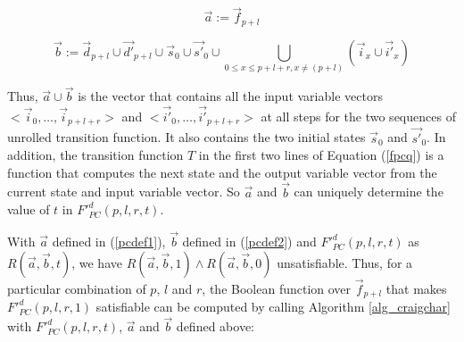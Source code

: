 \documentclass[runningheads,a4paper,orivec]{llncs}
\begin{document}
% 


\begin{equation}\label{pcdef1}
\vec{a}:=\vec{f}_{p+l}
\end{equation}

\begin{equation}\label{pcdef2}
\vec{b}:=\vec{d}_{p+l}\cup \vec{d'}_{p+l}\cup \vec{s}_0\cup \vec{s'}_0\cup\bigcup_{0\le x\le p+l+r,x\neq (p+l)}(\vec{i}_{x}\cup\vec{i'}_{x})
\end{equation}

Thus,
$\vec{a}\cup\vec{b}$ is the vector that contains all the input variable vectors $<\vec{i}_0,\dots,\vec{i}_{p+l+r}>$ and $<\vec{i'}_0,\dots,\vec{i'}_{p+l+r}>$
at all steps for the two sequences of unrolled transition function.
It also contains the two initial states $\vec{s}_0$ and $\vec{s'}_0$.
In addition,
the transition function $T$ in the first two lines of Equation (\ref{fpcq})
is a function that computes the next state and the output variable vector from the current state and input variable vector.
So $\vec{a}$ and $\vec{b}$ can uniquely determine the value of $t$ in $F'^d_{PC}(p,l,r,t)$.

With $\vec{a}$ defined in (\ref{pcdef1}),
$\vec{b}$ defined in (\ref{pcdef2})
and $F'^d_{PC}(p,l,r,t)$ as $R(\vec{a},\vec{b},t)$,
we have $R(\vec{a},\vec{b},1)\wedge R(\vec{a},\vec{b},0)$ unsatisfiable.
Thus,
for a particular combination of $p$, $l$ and $r$,
the Boolean function over $\vec{f}_{p+l}$ that makes $F'^d_{PC}(p,l,r,1)$ satisfiable can be computed 
by calling Algorithm \ref{alg_craigchar} with $F'^d_{PC}(p,l,r,t)$, $\vec{a}$ and $\vec{b}$ defined above:
\end{document}
